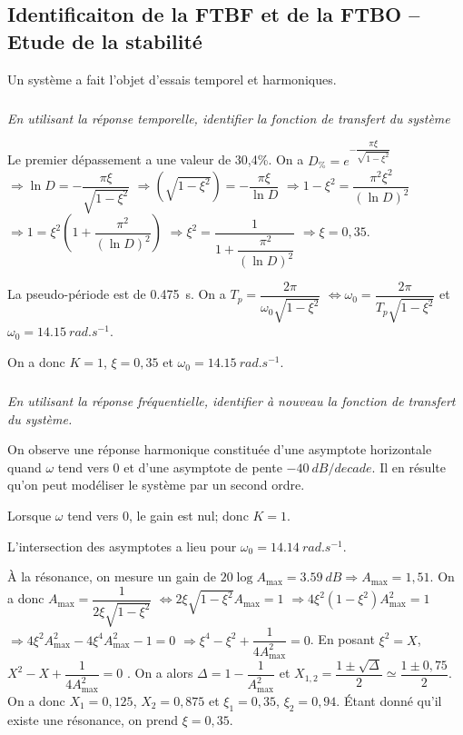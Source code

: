 \documentclass[10pt,fleqn]{article} %
\begin{document}
\def\pathfig{images}

\vspace{4cm}
\pagestyle{fancy}
\thispagestyle{plain}

\def\columnseprulecolor{\color{ocre}}
\setlength{\columnseprule}{0.4pt} 

\def\pathfig{images}

\ifprof
\else
\begin{multicols}{2}
\fi
\subsection*{Identificaiton de la FTBF et de la FTBO -- Etude de la stabilité}
Un système a fait l’objet d’essais temporel et harmoniques.




\subparagraph{}\textit{En utilisant la réponse temporelle, identifier la fonction de transfert du système}
\ifprof
\begin{corrige}
Le premier dépassement a une valeur de 30,4\%. On a
$D_\%=e^{-\dfrac{\pi \xi}{\sqrt{1-\xi^2}}}$
$\Rightarrow \ln D = -\dfrac{\pi \xi}{\sqrt{1-\xi^2}}$
$\Rightarrow \left( \sqrt{1-\xi^2} \right)  = -\dfrac{\pi \xi}{\ln D}$
$\Rightarrow 1-\xi^2= \dfrac{\pi^2 \xi^2}{\left(\ln D\right)^2}$
$\Rightarrow 1= \xi^2\left( 1+\dfrac{\pi^2 }{\left(\ln D\right)^2}\right)$
$\Rightarrow \xi^2= \dfrac{1}{ 1+\dfrac{\pi^2 }{\left(\ln D\right)^2}}$
$\Rightarrow \xi=0,35$.

La pseudo-période est de \SI{0,475}{s}. On a  $T_p=\dfrac{2\pi}{\omega_0\sqrt{1-\xi^2}}$
$\Leftrightarrow \omega_0=\dfrac{2\pi}{T_p\sqrt{1-\xi^2}}$ et $\omega_0=\SI{14,15}{rad.s^{-1}}$.
 
 On a donc $K=1$, $\xi=0,35$ et $\omega_0=\SI{14,15}{rad.s^{-1}}$.
\end{corrige}
\else
\fi

\subparagraph{}\textit{En utilisant la réponse fréquentielle, identifier à nouveau la fonction de transfert du système.}
\ifprof
\begin{corrige}
On observe une réponse harmonique constituée d'une asymptote horizontale quand $\omega$ tend vers 0 et d'une asymptote de pente $-\SI{40}{dB/decade}$. Il en résulte qu'on peut modéliser le système par un second ordre. 

Lorsque $\omega$ tend vers 0, le gain est nul; donc $K=1$.

L'intersection des asymptotes a lieu pour $\omega_0=\SI{14,14}{rad.s^{-1}}$. 

À la résonance, on mesure un gain de $20\log A_{\text{max}}=\SI{3,59}{dB}\Rightarrow A_{\text{max}}=1,51$. On a donc 
$A_{\text{max}} = \dfrac{1}{2\xi\sqrt{1-\xi^2}}$
$\Leftrightarrow {2\xi\sqrt{1-\xi^2}}A_{\text{max}}=1$
$\Rightarrow 4\xi^2\left(1-\xi^2\right)A_{\text{max}}^2=1 $
$\Rightarrow 4\xi^2A_{\text{max}}^2 -4\xi^4 A_{\text{max}}^2-1=0 $
$\Rightarrow \xi^4 - \xi^2 +\dfrac{1}{4A_{\text{max}}^2}=0 $. En posant $\xi^2=X$,  
$ X^2 - X +\dfrac{1}{4A_{\text{max}}^2}=0 $
. On a alors $\Delta = 1-\dfrac{1}{A_{\text{max}}^2}$ et $X_{1,2}=\dfrac{1\pm \sqrt{\Delta}}{2}\simeq \dfrac{1\pm 0,75}{2}$. On a donc $X_1=0,125$, $X_2=0,875$ et $\xi_1=0,35$, $\xi_2=0,94$. Étant donné qu'il existe une résonance, on prend $\xi=0,35$.


\end{corrige}
\end{multicols}
\end{document}
